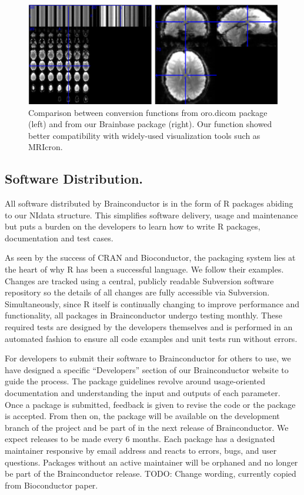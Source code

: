 \documentclass{nature}
\begin{document}
\begin{figure}[tb]
\centering
\includegraphics[width=400pt]{fig/brainconductor/dicom.png}
\caption{Comparison between conversion functions from oro.dicom package (left)
and from our Brainbase  package (right).  Our function showed better
compatibility  with widely-used visualization tools such as MRIcron.}
\label{fig:dicom}
\end{figure}





\subsection{Software Distribution.}

All software distributed by Brainconductor is in the form of R packages abiding
to our NIdata structure. This
simplifies software delivery, usage and maintenance but puts a burden on the
developers
to learn how to write R packages, documentation and test cases.

As seen by the success of CRAN and Bioconductor, the packaging system lies
at the heart of why R has been a successful language. We follow their examples.
Changes are tracked using a central, publicly readable Subversion software
repository
so the details of all changes are fully accessible via Subversion.
Simultaneously, since
R itself is continually changing to improve performance and functionality, all
packages
in Brainconductor undergo testing monthly. These required tests are designed by
the
developers themselves and is performed in an automated fashion to ensure
all code examples and unit tests run without errors.

For developers to submit their software to Brainconductor for others to use,
we have designed a specific ``Developers'' section of our Brainconductor website
to guide the process. The package guidelines revolve around usage-oriented
documentation and understanding the input and outputs of each parameter.
 Once
a package is submitted, feedback is given to revise the code or the package is
accepted.
From then on, the package will be available on the
development branch of the project and be part of in the next release of
Brainconductor.
We expect releases to be made every 6 months.
Each package has a designated maintainer responsive by email address and reacts
to
errors, bugs, and user questions. Packages without an active maintainer will be
orphaned and no longer be part of the Brainconductor release.
{\color{red}TODO: Change wording, currently copied from Bioconductor paper.}
\end{document}
